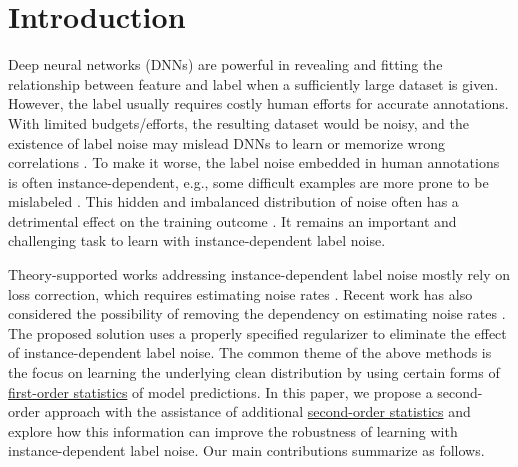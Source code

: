 \documentclass[final]{cvpr}
\begin{document}
\vspace{-10pt}
\section{Introduction}
Deep neural networks (DNNs) are powerful in revealing and fitting the relationship between feature  and label  when a sufficiently large dataset is given. However, the label  usually requires costly human efforts for accurate annotations. With limited budgets/efforts, the resulting dataset would be noisy, and the existence of label noise may mislead DNNs to learn or memorize wrong correlations \cite{han2020sigua,han2020survey,wang2021learning,xia2021robust,zhang2016understanding}.
To make it worse, the label noise embedded in human annotations is often instance-dependent, e.g., some difficult examples are more prone to be mislabeled \cite{wang2021tackling}. This hidden and imbalanced distribution of noise often has a detrimental effect on the training outcome \cite{jiang2020beyond,liu2021importance}. It remains an important and challenging task to learn with instance-dependent label noise. 

Theory-supported works addressing instance-dependent label noise mostly rely on loss correction, which requires estimating noise rates \cite{xia2020parts}. Recent work has also considered the possibility of removing the dependency on estimating noise rates \cite{sieve2020}. The proposed solution uses a properly specified regularizer to eliminate the effect of instance-dependent label noise. The common theme of the above methods is the focus on learning the underlying clean distribution by using certain forms of \underline{first-order statistics} of model predictions. In this paper, we propose a second-order approach with the assistance of additional \underline{second-order statistics} and explore how this information can improve the robustness of learning with instance-dependent label noise.
Our main contributions summarize as follows. 
\end{document}
